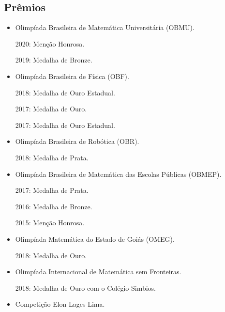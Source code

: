 \documentclass[a4paper]{article}
\begin{document}
\begin{paracol}{2}
\vspace{-1.0em}

\section*{\faAward \; Prêmios}
\scriptsize
\hspace{-2em}
\begin{minipage}[t]{0.24\textwidth}
\begin{itemize}
\item Olimpíada Brasileira de Matemática \newline Universitária (OBMU).

2020: Menção Honrosa.

2019: Medalha de Bronze.

\item Olimpíada Brasileira de Física (OBF).

2018: Medalha de Ouro Estadual.

2017: Medalha de Ouro.

2017: Medalha de Ouro Estadual.

\item Olimpíada Brasileira de Robótica (OBR).

2018: Medalha de Prata.

\end{itemize}
\end{minipage}
\begin{minipage}[t]{0.24\textwidth}
\begin{itemize}
\item Olimpíada Brasileira de Matemática \newline das Escolas Públicas (OBMEP).

2017: Medalha de Prata.

2016: Medalha de Bronze.

2015: Menção Honrosa.

\item Olimpíada Matemática do Estado de Goiás (OMEG).

2018: Medalha de Ouro.

\item Olimpíada Internacional de \newline Matemática sem Fronteiras.

2018: Medalha de Ouro com o Colégio Simbios.

\end{itemize}
\end{minipage}
\begin{minipage}[t]{0.24\textwidth}
\begin{itemize}
\item Competição Elon Lages Lima.


\end{itemize}
\end{minipage}
\end{paracol}
\end{document}
